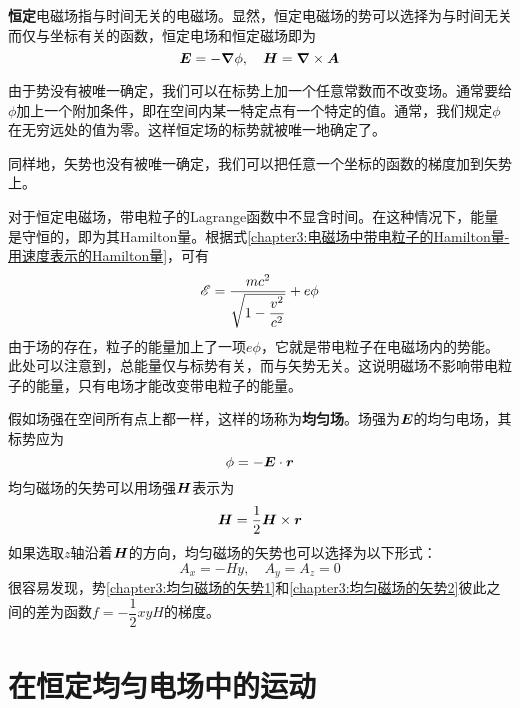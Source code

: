 {\bf 恒定}电磁场指与时间无关的电磁场。显然，恒定电磁场的势可以选择为与时间无关而仅与坐标有关的函数，恒定电场和恒定磁场即为
\begin{equation*}
	\boldsymbol{E} = -\boldsymbol{\nabla} \phi,\quad \boldsymbol{H} = \boldsymbol{\nabla} \times \boldsymbol{A}
\end{equation*}

由于势没有被唯一确定，我们可以在标势上加一个任意常数而不改变场。通常要给$\phi$加上一个附加条件，即在空间内某一特定点有一个特定的值。通常，我们规定$\phi$在无穷远处的值为零。这样恒定场的标势就被唯一地确定了。

同样地，矢势也没有被唯一确定，我们可以把任意一个坐标的函数的梯度加到矢势上。

对于恒定电磁场，带电粒子的Lagrange函数中不显含时间。在这种情况下，能量是守恒的，即为其Hamilton量。根据式\eqref{chapter3:电磁场中带电粒子的Hamilton量-用速度表示的Hamilton量}，可有
\begin{equation}
	\mathscr{E} = \frac{mc^2}{\sqrt{1-\dfrac{v^2}{c^2}}}+e\phi
	\label{chapter3:恒定电磁场中带电粒子的总能量}
\end{equation}
由于场的存在，粒子的能量加上了一项$e\phi$，它就是带电粒子在电磁场内的势能。此处可以注意到，总能量仅与标势有关，而与矢势无关。这说明磁场不影响带电粒子的能量，只有电场才能改变带电粒子的能量。

假如场强在空间所有点上都一样，这样的场称为{\bf 均匀场}。场强为$\boldsymbol{E}$的均匀电场，其标势应为
\begin{equation}
	\phi = -\boldsymbol{E}\cdot \boldsymbol{r}
	\label{chapter3:恒定均匀电场的标势}
\end{equation}
均匀磁场的矢势可以用场强$\boldsymbol{H}$表示为
\begin{equation}
	\boldsymbol{H} = \frac12 \boldsymbol{H}\times \boldsymbol{r}
	\label{chapter3:均匀磁场的矢势1}
\end{equation}
如果选取$z$轴沿着$\boldsymbol{H}$的方向，均匀磁场的矢势也可以选择为以下形式：
\begin{equation}
	A_x = -Hy,\quad A_y = A_z = 0
	\label{chapter3:均匀磁场的矢势2}
\end{equation}
很容易发现，势\eqref{chapter3:均匀磁场的矢势1}和\eqref{chapter3:均匀磁场的矢势2}彼此之间的差为函数$f = -\dfrac12 xyH$的梯度。

\section{在恒定均匀电场中的运动}

